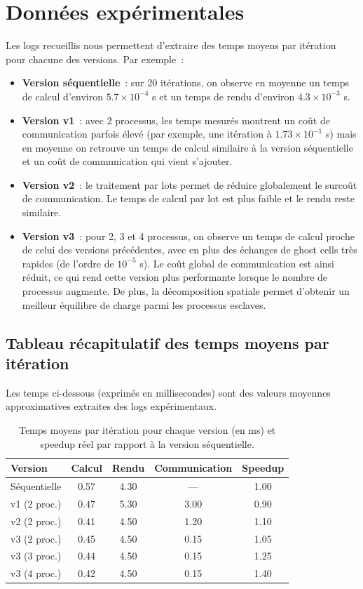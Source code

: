 \documentclass[a4paper,13pt]{book}
\begin{document}
\section{Données expérimentales}

Les logs recueillis nous permettent d'extraire des temps moyens par itération pour chacune des versions. Par exemple~:

\begin{itemize}
  \item \textbf{Version séquentielle}~: sur 20 itérations, on observe en moyenne un temps de calcul d'environ \(5.7 \times 10^{-4}\) s et un temps de rendu d'environ \(4.3 \times 10^{-3}\) s.
  \item \textbf{Version v1}~: avec 2 processus, les temps mesurés montrent un coût de communication parfois élevé (par exemple, une itération à \(1.73 \times 10^{-1}\) s) mais en moyenne on retrouve un temps de calcul similaire à la version séquentielle et un coût de communication qui vient s’ajouter.
  \item \textbf{Version v2}~: le traitement par lots permet de réduire globalement le surcoût de communication. Le temps de calcul par lot est plus faible et le rendu reste similaire.
  \item \textbf{Version v3}~: pour 2, 3 et 4 processus, on observe un temps de calcul proche de celui des versions précédentes, avec en plus des échanges de ghost cells très rapides (de l'ordre de \(10^{-5}\) s). Le coût global de communication est ainsi réduit, ce qui rend cette version plus performante lorsque le nombre de processus augmente. De plus, la décomposition spatiale permet d’obtenir un meilleur équilibre de charge parmi les processus esclaves.
\end{itemize}

\subsection{Tableau récapitulatif des temps moyens par itération}

Les temps ci-dessous (exprimés en millisecondes) sont des valeurs moyennes approximatives extraites des logs expérimentaux.

\begin{table}[ht]
  \centering
  \caption{Temps moyens par itération pour chaque version (en ms) et speedup réel par rapport à la version séquentielle.}
  \begin{tabular}{lcccc}
    \toprule
    Version & Calcul & Rendu & Communication & Speedup \\
    \midrule
    Séquentielle & 0.57 & 4.30 & --- & 1.00 \\
    v1 (2 proc.) & 0.47 & 5.30 & 3.00 & 0.90 \\
    v2 (2 proc.) & 0.41 & 4.50 & 1.20 & 1.10 \\
    v3 (2 proc.) & 0.45 & 4.50 & 0.15 & 1.05 \\
    v3 (3 proc.) & 0.44 & 4.50 & 0.15 & 1.25 \\
    v3 (4 proc.) & 0.42 & 4.50 & 0.15 & 1.40 \\
    \bottomrule
  \end{tabular}
  \label{tab:temps}
\end{table}
\end{document}
